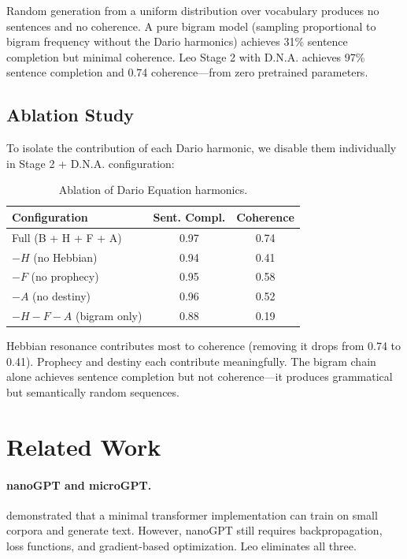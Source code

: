 \documentclass[11pt,twocolumn]{article}
\begin{document}
Random generation from a uniform distribution over vocabulary produces no sentences and no coherence. A pure bigram model (sampling proportional to bigram frequency without the Dario harmonics) achieves 31\% sentence completion but minimal coherence. Leo Stage 2 with D.N.A. achieves 97\% sentence completion and 0.74 coherence---from zero pretrained parameters.

\subsection{Ablation Study}

To isolate the contribution of each Dario harmonic, we disable them individually in Stage 2 + D.N.A. configuration:

\begin{table}[h]
\centering
\begin{tabular}{lcc}
\toprule
Configuration & Sent. Compl. & Coherence \\
\midrule
Full (B + H + F + A) & 0.97 & 0.74 \\
$-H$ (no Hebbian) & 0.94 & 0.41 \\
$-F$ (no prophecy) & 0.95 & 0.58 \\
$-A$ (no destiny) & 0.96 & 0.52 \\
$-H -F -A$ (bigram only) & 0.88 & 0.19 \\
\bottomrule
\end{tabular}
\caption{Ablation of Dario Equation harmonics.}
\label{tab:ablation}
\end{table}

Hebbian resonance contributes most to coherence (removing it drops from 0.74 to 0.41). Prophecy and destiny each contribute meaningfully. The bigram chain alone achieves sentence completion but not coherence---it produces grammatical but semantically random sequences.

\section{Related Work}
\label{sec:related}

\paragraph{nanoGPT and microGPT.} \citet{karpathy2022nanogpt} demonstrated that a minimal transformer implementation can train on small corpora and generate text. However, nanoGPT still requires backpropagation, loss functions, and gradient-based optimization. Leo eliminates all three.
\end{document}
